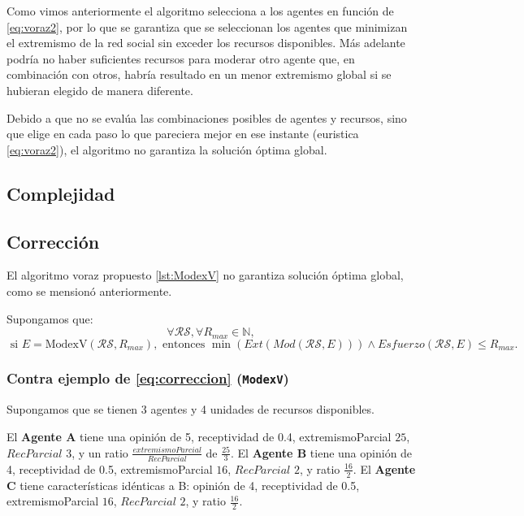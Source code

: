 \documentclass[letterpaper,10pt]{article}
\begin{document}
Como vimos anteriormente el algoritmo selecciona a los agentes en función de \eqref{eq:voraz2}, por lo que se garantiza que se seleccionan los agentes que minimizan el extremismo de la red social sin exceder los recursos disponibles. Más adelante podría no haber suficientes recursos para moderar otro agente que, en combinación con otros, habría resultado en un menor extremismo global si se hubieran elegido de manera diferente.

Debido a que no se evalúa las combinaciones posibles de agentes y recursos, sino que elige en cada paso lo que pareciera mejor en ese instante (euristica \eqref{eq:voraz2}), el algoritmo no garantiza la solución óptima global.

\subsection{Complejidad}
\label{subsec:complejidad_algoritmo_voraz}
\subsection{Corrección}
\label{subsec:correccion_algoritmo_voraz}
El algoritmo voraz propuesto \ref{lst:ModexV} no garantiza solución óptima global, como se mensionó anteriormente. 

Supongamos que:
\[
  \forall \mathcal{R}\mathcal{S}, \forall R_{max} \in \mathbb{N},
\]
\begin{equation}
\text{ si } E = \text{ModexV}(\mathcal{R}\mathcal{S}, R_{max}), \text{ entonces }
\min\left(Ext\left(Mod(\mathcal{R}\mathcal{S}, E)\right)\right) \land Esfuerzo(\mathcal{R}\mathcal{S}, E) \leq R_{max}.
\label{eq:correccion}
\end{equation}

\subsubsection*{Contra ejemplo de \eqref{eq:correccion} (\texttt{ModexV})}

Supongamos que se tienen 3 agentes y 4 unidades de recursos disponibles.

El \textbf{Agente A} tiene una opinión de 5, receptividad de 0.4, extremismoParcial \(25\), $RecParcial$ \(3\), y un ratio $\frac{extremismoParcial}{RecParcial}$ de \(\frac{25}{3}\). El \textbf{Agente B} tiene una opinión de 4, receptividad de 0.5, extremismoParcial \(16\), $RecParcial$ \(2\), y ratio \(\frac{16}{2}\). El \textbf{Agente C} tiene características idénticas a B: opinión de 4, receptividad de 0.5, extremismoParcial \(16\), $RecParcial$ \(2\), y ratio \(\frac{16}{2}\).
\\
\end{document}
